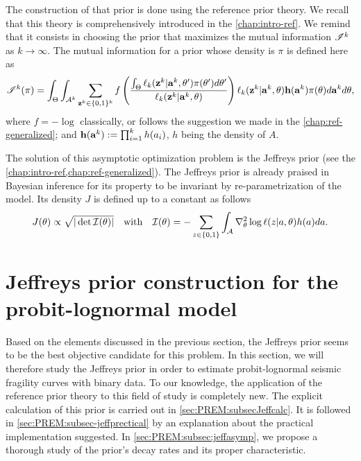 The construction of that prior is done using the reference prior theory.
We recall that this theory is comprehensively introduced in the \cref{chap:intro-ref}. %
We remind that it consists in choosing the prior that maximizes the mutual information $\mathscr{I}^k$ as $k\to\infty$. The mutual information for a prior whose density is $\pi$ is defined here as
    \begin{equation}
        \mathscr{I}^k(\pi) = \int_{\Theta}\int_{\mathcal{A}^k}\sum_{\mathbf{z}^k\in\{0,1\}^k}f\left(\frac{\int_\Theta\ell_k(\mathbf{z}^k|\mathbf{a}^k,\theta')\pi(\theta')d\theta'  }{\ell_k(\mathbf{z}^k|\mathbf{a}^k,\theta)}\right)\ell_k(\mathbf{z}^k|\mathbf{a}^k,\theta)\mathbf{h}(\mathbf{a}^k) \pi(\theta)d\mathbf{a}^kd\theta  ,
    \end{equation}
where $f=-\log$ classically, or follows the suggestion we made in the  \cref{chap:ref-generalized}; and $\mathbf{h}(\mathbf{a}^k):=\prod_{i=1}^kh(a_i) $, $h$ being the density of $A$.

The solution of this asymptotic optimization problem is the Jeffreys prior (see the \cref{chap:intro-ref,chap:ref-generalized}). The Jeffreys prior is already praised in Bayesian inference for its property to be invariant by re-parametrization of the model. Its density $J$ is defined up to a constant as follows
    \begin{equation}\label{eq:PREM:JcI}
        J(\theta)\propto \sqrt{|\det\mathcal{I}(\theta)|}\quad \text{with}\quad \mathcal{I}(\theta)= -\sum_{z\in\{0,1\}}\int_{\mathcal{A}} \nabla^2_\theta\log\ell(z|a,\theta)h(a)da.
    \end{equation}









\section{Jeffreys prior construction for the probit-lognormal model}\label{sec:PREM:Jeffreys}


Based on the elements discussed in the previous section, the Jeffreys prior seems to be the best objective candidate for this problem. In this section, we will therefore study the Jeffreys prior in order to estimate probit-lognormal seismic fragility curves with binary data. To our knowledge, the application of the reference prior theory to this field of study is completely new. The explicit calculation of this prior is carried out in \cref{sec:PREM:subsecJeffcalc}. It is followed in \cref{sec:PREM:subsec-jeffprectical} by an explanation about the practical implementation suggested.
In \cref{sec:PREM:subsec:jeffasymp}, we propose a thorough study of the prior's decay rates and its proper characteristic. %
%


